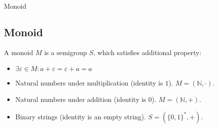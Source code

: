 \documentclass{beamer}
\begin{document}
\begin{frame}{Monoid}
	\subsection{Monoid}
	\begin{definition}
		A monoid $M$ is a semigroup $S$, which satisfies additional property:
		\begin{itemize}
			\item $\exists \varepsilon \in M : a + \varepsilon = \varepsilon + a = a$
		\end{itemize}
	\end{definition}

	\begin{example}
		\begin{itemize}
			\item Natural numbers under multiplication (identity is $1$). $M = (\mathbb{N}, \cdot)$.
			\item Natural numbers under addition (identity is $0$). $M = (\mathbb{N}, +)$.
			\item Binary strings (identity is an empty string). $S = (\{0, 1\}^*, +)$.
		\end{itemize}
	\end{example}
\end{frame}
\end{document}

